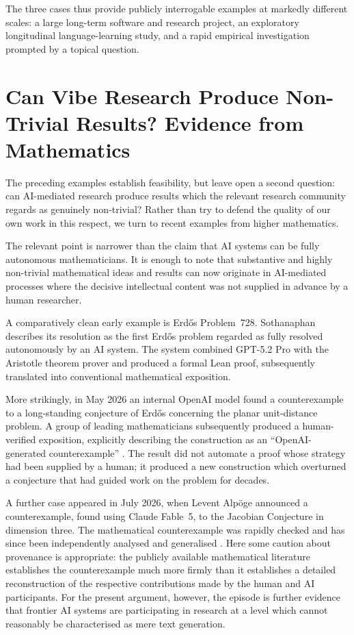 \documentclass[12pt]{article}
\begin{document}
The three cases thus provide publicly interrogable examples at markedly different scales: a large long-term software and research project, an exploratory longitudinal language-learning study, and a rapid empirical investigation prompted by a topical question.

\section{Can Vibe Research Produce Non-Trivial Results? Evidence from Mathematics}

The preceding examples establish feasibility, but leave open a second question: can AI-mediated research produce results which the relevant research community regards as genuinely non-trivial? Rather than try to defend the quality of our own work in this respect, we turn to recent examples from higher mathematics.

The relevant point is narrower than the claim that AI systems can be fully autonomous mathematicians. It is enough to note that substantive and highly non-trivial mathematical ideas and results can now originate in AI-mediated processes where the decisive intellectual content was not supplied in advance by a human researcher.

A comparatively clean early example is Erd\H{o}s Problem~728. Sothanaphan \citeyearpar{sothanaphan2026erdos728} describes its resolution as the first Erd\H{o}s problem regarded as fully resolved autonomously by an AI system. The system combined GPT-5.2 Pro with the Aristotle theorem prover and produced a formal Lean proof, subsequently translated into conventional mathematical exposition.

More strikingly, in May 2026 an internal OpenAI model found a counterexample to a long-standing conjecture of Erd\H{o}s concerning the planar unit-distance problem. A group of leading mathematicians subsequently produced a human-verified exposition, explicitly describing the construction as an ``OpenAI-generated counterexample'' \citep{alonEtAl2026unitdistance}. The result did not automate a proof whose strategy had been supplied by a human; it produced a new construction which overturned a conjecture that had guided work on the problem for decades.

A further case appeared in July 2026, when Levent Alp\"oge announced a counterexample, found using Claude Fable~5, to the Jacobian Conjecture in dimension three. The mathematical counterexample was rapidly checked and has since been independently analysed and generalised \citep{gao2026jacobian,lee2026jacobian}. Here some caution about provenance is appropriate: the publicly available mathematical literature establishes the counterexample much more firmly than it establishes a detailed reconstruction of the respective contributions made by the human and AI participants. For the present argument, however, the episode is further evidence that frontier AI systems are participating in research at a level which cannot reasonably be characterised as mere text generation.
\end{document}

